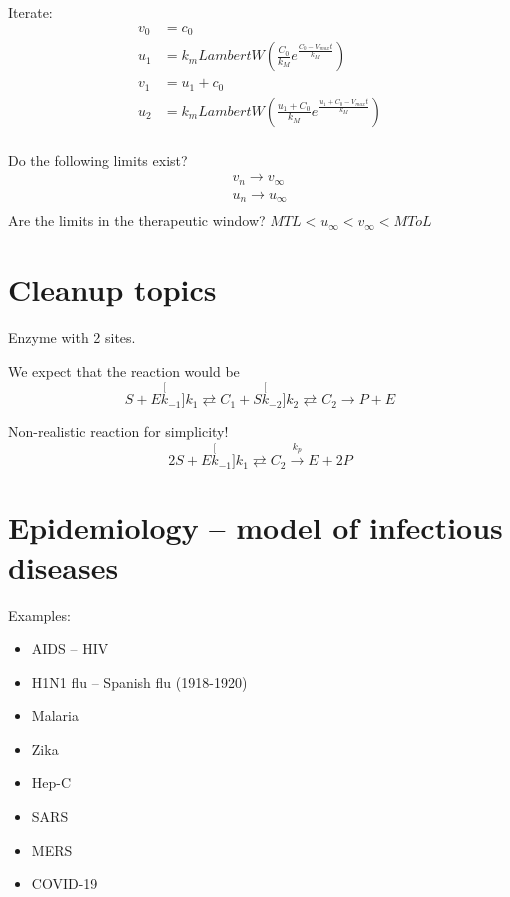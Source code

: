 \documentclass[
	date={October 30{,} 2024},
	month={10},
	day={30}
]{math486notes}
\begin{document}
Iterate:
\begin{equation*}
\begin{aligned}
	v_{0} &= c_{0}\\
	u_{1} &= k_{m}LambertW\left( \frac{C_{0}}{k_{M}}e^{\frac{C_{0} - V_{max}t}{k_{M}}} \right)\\
	v_{1} &= u_{1} + c_{0}\\
	u_{2} &= k_{m}LambertW\left( \frac{u_{1} +  C_{0}}{k_{M}}e^{\frac{u_{1} + C_{0} - V_{max}t}{k_{M}}} \right)\\
\end{aligned}
\end{equation*}

Do the following limits exist?
\begin{equation*}
\begin{aligned}
	v_{n} \rightarrow v_{\infty}\\
	u_{n} \rightarrow u_{\infty}\\
\end{aligned}
\end{equation*}
Are the limits in the therapeutic window?
$MTL < u_{\infty} < v_{\infty} < MToL$

\section{Cleanup topics}\label{sec:cleanup-topics}
Enzyme with 2 sites.

We expect that the reaction would be
\begin{equation}
	S + E \stackrel[k_{-1}]{k_{1}}{\rightleftarrows} C_{1} + S \stackrel[k_{-2}]{k_{2}}{\rightleftarrows} C_{2} \rightarrow P + E
	\label{eq:mm-2-site}
\end{equation}

Non-realistic reaction for simplicity!
\[ 2S + E \stackrel[k_{-1}]{k_{1}}{\rightleftarrows} C_{2} \stackrel{k_{p}}{\rightarrow} E + 2P \]

\section{Epidemiology -- model of infectious diseases}\label{sec:epidemiology----model-of-infectious-diseases}
Examples:
\begin{itemize}
	\item AIDS -- HIV
	\item H1N1 flu -- Spanish flu (1918-1920)
	\item Malaria
	\item Zika
	\item Hep-C
	\item SARS
	\item MERS
	\item COVID-19
\end{itemize}
\end{document}
